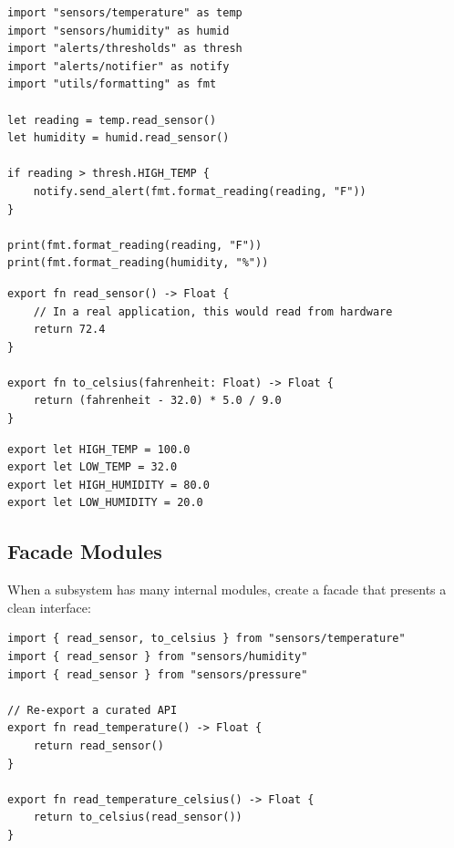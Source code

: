 \begin{lstlisting}[language=Lattice, caption={weather\_station/main.lat --- tying it all together}]
import "sensors/temperature" as temp
import "sensors/humidity" as humid
import "alerts/thresholds" as thresh
import "alerts/notifier" as notify
import "utils/formatting" as fmt

let reading = temp.read_sensor()
let humidity = humid.read_sensor()

if reading > thresh.HIGH_TEMP {
    notify.send_alert(fmt.format_reading(reading, "F"))
}

print(fmt.format_reading(reading, "F"))
print(fmt.format_reading(humidity, "%"))
\end{lstlisting}

\begin{lstlisting}[language=Lattice, caption={sensors/temperature.lat}]
export fn read_sensor() -> Float {
    // In a real application, this would read from hardware
    return 72.4
}

export fn to_celsius(fahrenheit: Float) -> Float {
    return (fahrenheit - 32.0) * 5.0 / 9.0
}
\end{lstlisting}

\begin{lstlisting}[language=Lattice, caption={alerts/thresholds.lat}]
export let HIGH_TEMP = 100.0
export let LOW_TEMP = 32.0
export let HIGH_HUMIDITY = 80.0
export let LOW_HUMIDITY = 20.0
\end{lstlisting}

\subsection{Facade Modules}\label{subsec:facade-modules}

When a subsystem has many internal modules, create a facade that presents a clean interface:

\begin{lstlisting}[language=Lattice, caption={sensors/mod.lat --- a facade module}]
import { read_sensor, to_celsius } from "sensors/temperature"
import { read_sensor } from "sensors/humidity"
import { read_sensor } from "sensors/pressure"

// Re-export a curated API
export fn read_temperature() -> Float {
    return read_sensor()
}

export fn read_temperature_celsius() -> Float {
    return to_celsius(read_sensor())
}
\end{lstlisting}

